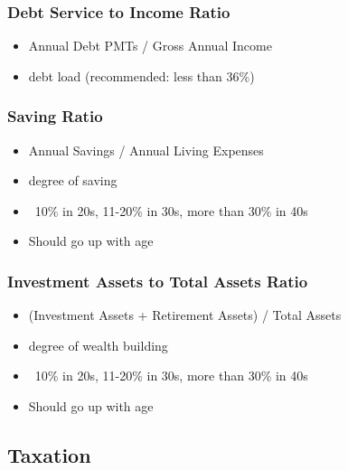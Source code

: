 \documentclass[12pt]{article}
\begin{document}
            \subsubsection{Debt Service to Income Ratio}
                \begin{itemize}
                    \item Annual Debt PMTs / Gross Annual Income
                    \item debt load (recommended: less than 36\%)
                \end{itemize}
            \subsubsection{Saving Ratio}
                \begin{itemize}
                    \item Annual Savings / Annual Living Expenses
                    \item degree of saving
                    \item ~10\% in 20s, 11-20\% in 30s, more than 30\% in 40s
                    \item Should go up with age
                \end{itemize}
            \subsubsection{Investment Assets to Total Assets Ratio}
                \begin{itemize}
                    \item (Investment Assets + Retirement Assets) / Total Assets
                    \item degree of wealth building
                    \item ~10\% in 20s, 11-20\% in 30s, more than 30\% in 40s
                    \item Should go up with age
                \end{itemize}
        
        \subsection{Taxation}
\end{document}
